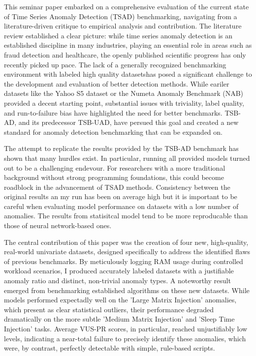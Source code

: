 \documentclass[12pt,oneside]{article}
\begin{document}
This seminar paper embarked on a comprehensive evaluation of the current state of Time Series Anomaly Detection (TSAD) benchmarking, navigating from a literature-driven critique to empirical analysis and contribution. The literature review established a clear picture: while time series anomaly detection is an established discipline in many industries, playing an essential role in areas such as fraud detection and healthcare, the openly published scientific progress has only recently picked up pace. The lack of a generally recognized benchmarking environment with labeled high quality datasetshas posed a significant challenge to the development and evaluation of better detection methods. While eariler datasets like the Yahoo S5 dataset or the Numeta Anomaly Benchmark (NAB) provided a decent starting point, substantial issues with triviality, label quality, and run-to-failure bias have highlighted the need for better benchmarks. TSB-AD, and its predecessor TSB-UAD, have persued this goal and created a new standard for anomaly detection benchmarking that can be expanded on. \par
The attempt to replicate the results provided by the TSB-AD benchmark has shown that many hurdles exist. In particular, running all provided models turned out to be a challenging endevour. For researchers with a more traditional background without strong programming foundations, this could become roadblock in the advancement of TSAD methods. Consistency between the original results an my run has been on average high but it is important to be careful when evaluating model performance on datasets with a low number of anomalies. The results from statisitcal model tend to be more reproducable than those of neural network-based ones. \par
The central contribution of this paper was the creation of four new, high-quality, real-world univariate datasets, designed specifically to address the identified flaws of previous benchmarks. By meticulously logging RAM usage during controlled workload scenarios, I produced accurately labeled datasets with a justifiable anomaly ratio and distinct, non-trivial anomaly types. A noteworthy result emerged from benchmarking established algorithms on these new datasets. While models performed expectadly well on the 'Large Matrix Injection' anomalies, which present as clear statistical outliers, their performance degraded dramatically on the more subtle 'Medium Matrix Injection' and 'Sleep Time Injection' tasks. Average VUS-PR scores, in particular, reached unjustifiably low levels, indicating a near-total failure to precisely identify these anomalies, which were, by contrast, perfectly detectable with simple, rule-based scripts. \par
\end{document}

